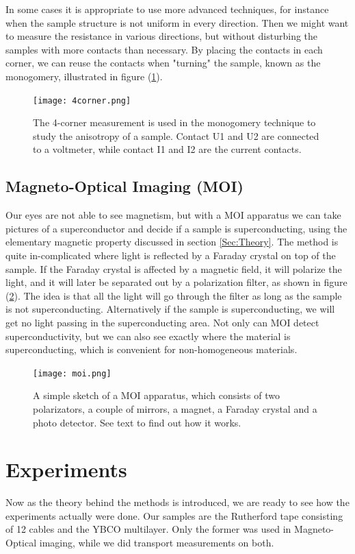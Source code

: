 \documentclass{comjnl}
\begin{document}
In some cases it is appropriate to use more advanced techniques, for instance when the sample structure is not uniform in every direction. Then we might want to measure the resistance in various directions, but without disturbing the samples with more contacts than necessary. By placing the contacts in each corner, we can reuse the contacts when "turning" the sample, known as the monogomery, illustrated in figure (\ref{fig:4corner}). 

\begin{figure}[h]
\centering
\texttt{[image: 4corner.png]}
\caption{The 4-corner measurement is used in the monogomery technique to study the anisotropy of a sample. Contact U1 and U2 are connected to a voltmeter, while contact I1 and I2 are the current contacts. \label{fig:4corner}}
\end{figure}

\subsection{Magneto-Optical Imaging (MOI)}
Our eyes are not able to see magnetism, but with a MOI apparatus we can take pictures of a superconductor and decide if a sample is superconducting, using the elementary magnetic property discussed in section \ref{Sec:Theory}. The method is quite in-complicated where light is reflected by a Faraday crystal on top of the sample. If the Faraday crystal is affected by a magnetic field, it will polarize the light, and it will later be separated out by a polarization filter, as shown in figure (\ref{fig:MOI}). The idea is that all the light will go through the filter as long as the sample is not superconducting. Alternatively if the sample is superconducting, we will get no light passing in the superconducting area. Not only can MOI detect superconductivity, but we can also see exactly where the material is superconducting, which is convenient for non-homogeneous materials. 
\begin{figure}[h]
\centering
\texttt{[image: moi.png]}
\caption{A simple sketch of a MOI apparatus, which consists of two polarizators, a couple of mirrors, a magnet, a Faraday crystal and a photo detector. See text to find out how it works. \label{fig:MOI}}
\end{figure}

\section{Experiments}\label{Sec:Experiments}
Now as the theory behind the methods is introduced, we are ready to see how the experiments actually were done. Our samples are the Rutherford tape consisting of 12 cables and the YBCO multilayer. Only the former was used in Magneto-Optical imaging, while we did transport measurements on both. 
\end{document}
